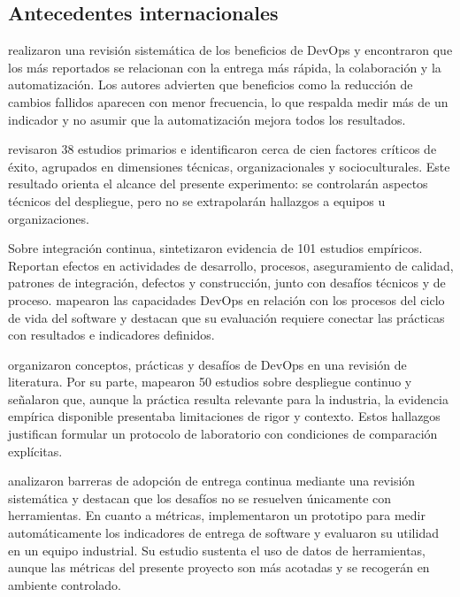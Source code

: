 \documentclass[12pt,a4paper]{article}
\begin{document}
\subsection{Antecedentes internacionales}

\citet{faustino2022} realizaron una revisión sistemática de los beneficios de DevOps y encontraron que los más reportados se relacionan con la entrega más rápida, la colaboración y la automatización. Los autores advierten que beneficios como la reducción de cambios fallidos aparecen con menor frecuencia, lo que respalda medir más de un indicador y no asumir que la automatización mejora todos los resultados.

\citet{azad2023} revisaron 38 estudios primarios e identificaron cerca de cien factores críticos de éxito, agrupados en dimensiones técnicas, organizacionales y socioculturales. Este resultado orienta el alcance del presente experimento: se controlarán aspectos técnicos del despliegue, pero no se extrapolarán hallazgos a equipos u organizaciones.

Sobre integración continua, \citet{soares2022} sintetizaron evidencia de 101 estudios empíricos. Reportan efectos en actividades de desarrollo, procesos, aseguramiento de calidad, patrones de integración, defectos y construcción, junto con desafíos técnicos y de proceso. \citet{amaro2025} mapearon las capacidades DevOps en relación con los procesos del ciclo de vida del software y destacan que su evaluación requiere conectar las prácticas con resultados e indicadores definidos.

\citet{leite2019} organizaron conceptos, prácticas y desafíos de DevOps en una revisión de literatura. Por su parte, \citet{rodriguez2017} mapearon 50 estudios sobre despliegue continuo y señalaron que, aunque la práctica resulta relevante para la industria, la evidencia empírica disponible presentaba limitaciones de rigor y contexto. Estos hallazgos justifican formular un protocolo de laboratorio con condiciones de comparación explícitas.

\citet{chen2018} analizaron barreras de adopción de entrega continua mediante una revisión sistemática y destacan que los desafíos no se resuelven únicamente con herramientas. En cuanto a métricas, \citet{sallin2021} implementaron un prototipo para medir automáticamente los indicadores de entrega de software y evaluaron su utilidad en un equipo industrial. Su estudio sustenta el uso de datos de herramientas, aunque las métricas del presente proyecto son más acotadas y se recogerán en ambiente controlado.
\end{document}
